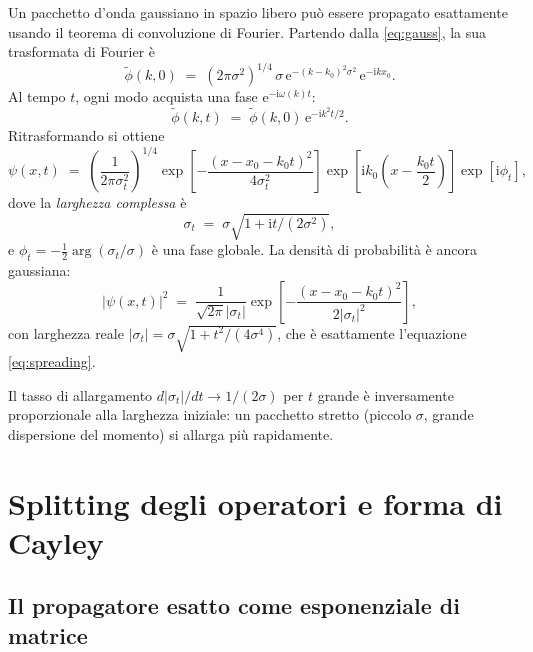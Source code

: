 \documentclass[12pt, a4paper]{article}
\newcommand{\ii}{\mathrm{i}}          %
\newcommand{\ee}{\mathrm{e}}          %
\begin{document}
Un pacchetto d'onda gaussiano in spazio libero può essere propagato
esattamente usando il teorema di convoluzione di Fourier.  Partendo
dalla \eqref{eq:gauss}, la sua trasformata di Fourier è
\begin{equation}
  \tilde{\phi}(k,0) \;=\;
  (2\pi\sigma^2)^{1/4}\,\sigma\,\ee^{-(k-k_0)^2\sigma^2}\,\ee^{-\ii k x_0}.
\end{equation}
Al tempo $t$, ogni modo acquista una fase $\ee^{-\ii\omega(k)t}$:
\begin{equation}
  \tilde{\phi}(k,t) \;=\; \tilde{\phi}(k,0)\,\ee^{-\ii k^2 t/2}.
\end{equation}
Ritrasformando si ottiene
\begin{equation}
  \psi(x,t) \;=\;
  \left(\frac{1}{2\pi\sigma_t^2}\right)^{1/4}
  \exp\!\left[-\frac{(x - x_0 - k_0 t)^2}{4\sigma_t^2}\right]
  \exp\!\left[\ii k_0\!\left(x - \frac{k_0 t}{2}\right)\right]
  \exp\!\left[\ii\phi_t\right],
  \label{eq:free_packet}
\end{equation}
dove la \emph{larghezza complessa} è
\begin{equation}
  \sigma_t \;=\; \sigma\sqrt{1 + \ii t/(2\sigma^2)},
\end{equation}
e $\phi_t = -\frac{1}{2}\arg(\sigma_t/\sigma)$ è una fase globale.
La densità di probabilità è ancora gaussiana:
\begin{equation}
  |\psi(x,t)|^2 \;=\;
  \frac{1}{\sqrt{2\pi}|\sigma_t|}
  \exp\!\left[-\frac{(x-x_0-k_0 t)^2}{2|\sigma_t|^2}\right],
\end{equation}
con larghezza reale $|\sigma_t| = \sigma\sqrt{1 + t^2/(4\sigma^4)}$,
che è esattamente l'equazione \eqref{eq:spreading}.

Il tasso di allargamento $d|\sigma_t|/dt \to 1/(2\sigma)$ per $t$
grande è inversamente proporzionale alla larghezza iniziale: un
pacchetto stretto (piccolo $\sigma$, grande dispersione del momento)
si allarga più rapidamente.

\section{Splitting degli operatori e forma di Cayley}
\label{app:splitting}

\subsection{Il propagatore esatto come esponenziale di matrice}
\end{document}
